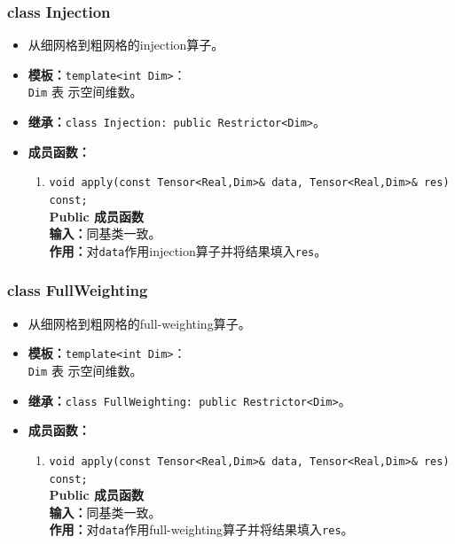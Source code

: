 \documentclass[a4paper,twoside]{ctexart}
\begin{document}
\subsubsection*{class Injection}
\begin{itemize}
    \item 从细网格到粗网格的injection算子。
    \item \textbf{模板：}\texttt{template<int Dim>}：\\\texttt{Dim} 表
      示空间维数。
      \item \textbf{继承：}\texttt{class Injection: public Restrictor<Dim>}。
    \item \textbf{成员函数：}
            \begin{enumerate}[(1)]
                \item \texttt{void apply(const Tensor<Real,Dim>\& data,
                    Tensor<Real,Dim>\& res) const;}\\
                  \textbf{Public 成员函数}\\
                \textbf{输入：}同基类一致。\\
                \textbf{作用：}对\texttt{data}作用injection算子并将结果填入\texttt{res}。
            \end{enumerate}
\end{itemize}
\subsubsection*{class FullWeighting}
\begin{itemize}
    \item 从细网格到粗网格的full-weighting算子。
    \item \textbf{模板：}\texttt{template<int Dim>}：\\\texttt{Dim} 表
      示空间维数。
      \item \textbf{继承：}\texttt{class FullWeighting: public Restrictor<Dim>}。
    \item \textbf{成员函数：}
            \begin{enumerate}[(1)]
                \item \texttt{void apply(const Tensor<Real,Dim>\& data,
                    Tensor<Real,Dim>\& res) const;}\\
                  \textbf{Public 成员函数}\\
                \textbf{输入：}同基类一致。\\
                \textbf{作用：}对\texttt{data}作用full-weighting算子并将结果填入\texttt{res}。
            \end{enumerate}
\end{itemize}
\end{document}
